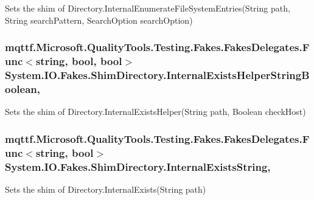 Sets the shim of Directory.\-Internal\-Enumerate\-File\-System\-Entries(\-String path, String search\-Pattern, Search\-Option search\-Option)

\hypertarget{class_system_1_1_i_o_1_1_fakes_1_1_shim_directory_ae7e840bf96944a3404eb3e6dd6c1280c}{
\subsubsection[{Internal\-Exists\-Helper\-String\-Boolean}]{\setlength{\rightskip}{0pt plus 5cm}mqttf.\-Microsoft.\-Quality\-Tools.\-Testing.\-Fakes.\-Fakes\-Delegates.\-Func$<$string, bool, bool$>$ System.\-I\-O.\-Fakes.\-Shim\-Directory.\-Internal\-Exists\-Helper\-String\-Boolean\hspace{0.3cm}{\ttfamily [static]}, {\ttfamily [set]}}}\label{class_system_1_1_i_o_1_1_fakes_1_1_shim_directory_ae7e840bf96944a3404eb3e6dd6c1280c}


Sets the shim of Directory.\-Internal\-Exists\-Helper(\-String path, Boolean check\-Host)

\hypertarget{class_system_1_1_i_o_1_1_fakes_1_1_shim_directory_a2d445f4638c4f673403056d0097e4c12}{
\subsubsection[{Internal\-Exists\-String}]{\setlength{\rightskip}{0pt plus 5cm}mqttf.\-Microsoft.\-Quality\-Tools.\-Testing.\-Fakes.\-Fakes\-Delegates.\-Func$<$string, bool$>$ System.\-I\-O.\-Fakes.\-Shim\-Directory.\-Internal\-Exists\-String\hspace{0.3cm}{\ttfamily [static]}, {\ttfamily [set]}}}\label{class_system_1_1_i_o_1_1_fakes_1_1_shim_directory_a2d445f4638c4f673403056d0097e4c12}


Sets the shim of Directory.\-Internal\-Exists(\-String path)

